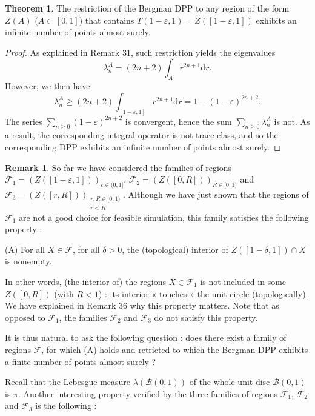 \documentclass[11pt]{article}
\theoremstyle{plain}
\theoremstyle{definition}
\newtheorem{theorem}[definition]{Theorem}
\newtheorem{remark}[definition]{Remark}
\begin{document}
\begin{theorem} The restriction of the Bergman DPP to any region of the form $ Z(A) $ ($ A \subset [0,1] $) that contains $ T(1-\varepsilon,1) = Z([1-\varepsilon,1]) $ exhibits an infinite number of points almost surely.
\end{theorem}

\begin{proof}
As explained in Remark 31, such restriction yields the eigenvalues
\[
\lambda_n^A = (2n+2)\int_A r^{2n+1} \mathrm d r .
\]
However, we then have 
\[
\lambda_n^A \geqslant (2n+2) \int_{[1-\varepsilon, 1]} r^{2n+1} \mathrm d r = 1 - (1-\varepsilon)^{2n+2}.
\]
The series $ \displaystyle \sum_{n\ge 0} (1-\varepsilon)^{2n+2} $ is convergent, hence the sum $ \displaystyle \sum_{n \ge 0} \lambda_n^A $ is not. As a result, the corresponding integral operator is not trace class, and so the corresponding DPP exhibits an infinite number of points almost surely.
\end{proof}

\begin{remark}
    So far we have considered the families of regions $ \mathcal F_1 = (Z([1-\varepsilon, 1]))_{\varepsilon \in (0,1]} $, $ \mathcal F_2 = (Z([0,R]))_{R \in [0,1)} $ and $ \mathcal F_3 = (Z([r,R]))_{\substack{r,R \in [0,1) \\ r < R }} $. Although we have just shown that the regions of $ \mathcal F_1 $ are not a good choice for feasible simulation, this family satisfies the following property :
\end{remark}

\begin{center} 
    (A) For all $ X \in \mathcal F$, for all $ \delta > 0 $, the (topological) interior of $Z([1-\delta, 1]) \cap X$ is nonempty.
\end{center}

In other words, (the interior of) the regions $X \in \mathcal F_1$ is not included in some $ Z([0,R]) $ (with $ R < 1 $) : its interior « touches » the unit circle (topologically). We have explained in Remark 36 why this property matters. Note that as opposed to $\mathcal F_1$, the families $\mathcal F_2$ and $\mathcal F_3$ do not satisfy this property.

It is thus natural to ask the following question : does there exist a family of regions $ \mathcal F $, for which (A) holds and retricted to which the Bergman DPP exhibits a finite number of points almost surely ?

Recall that the Lebesgue measure $ \lambda(\mathcal B(0,1)) $ of the whole unit disc $ \mathcal B(0,1)$ is $ \pi $. Another interesting property verified by the three families of regions $ \mathcal F_1 $, $ \mathcal F_2 $ and $ \mathcal F_3 $ is the following :
\end{document}
